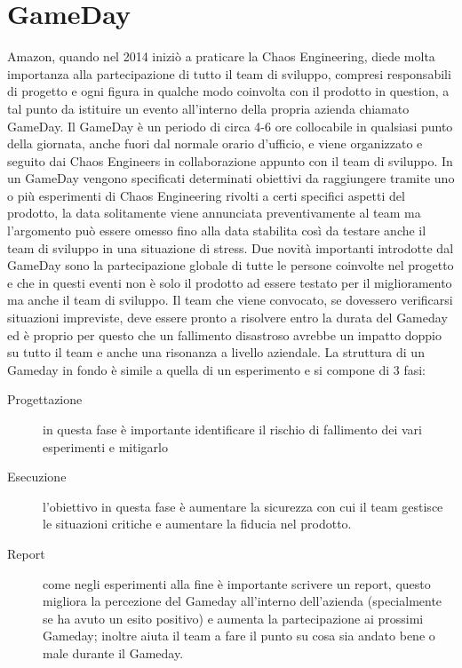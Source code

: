 \section{GameDay}
Amazon, quando nel 2014 iniziò a praticare la Chaos Engineering, diede molta importanza alla partecipazione di tutto il team di sviluppo, compresi responsabili di progetto e ogni figura in qualche modo coinvolta con il prodotto in question, a tal punto da istituire un evento all'interno della propria azienda chiamato GameDay.
Il GameDay è un periodo di circa 4-6 ore collocabile in qualsiasi punto della giornata, anche fuori dal normale orario d'ufficio, e viene organizzato e seguito dai Chaos Engineers in collaborazione appunto con il team di sviluppo.
In un GameDay vengono specificati determinati obiettivi da raggiungere tramite uno o più esperimenti di Chaos Engineering rivolti a certi specifici aspetti del prodotto, la data solitamente viene annunciata preventivamente al team ma l'argomento può essere omesso fino alla data stabilita così da testare anche il team di sviluppo in una situazione di stress.
Due novità importanti introdotte dal GameDay sono la partecipazione globale di tutte le persone coinvolte nel progetto e che in questi eventi non è solo il prodotto ad essere testato per il miglioramento ma anche il team di sviluppo.
Il team che viene convocato, se dovessero verificarsi situazioni impreviste, deve essere pronto a risolvere entro la durata del Gameday ed è proprio per questo che un fallimento disastroso avrebbe un impatto doppio su tutto il team e anche una risonanza a livello aziendale.
La struttura di un Gameday in fondo è simile a quella di un esperimento e si compone di 3 fasi:
\begin{description}
    \item[Progettazione] in questa fase è importante identificare il rischio di fallimento dei vari esperimenti e mitigarlo
    \item[Esecuzione] l'obiettivo in questa fase è aumentare la sicurezza con cui il team gestisce le situazioni critiche e aumentare la fiducia nel prodotto.
    \item[Report] come negli esperimenti alla fine è importante scrivere un report, questo migliora la percezione del Gameday all'interno dell'azienda (specialmente se ha avuto un esito positivo) e aumenta la partecipazione ai prossimi Gameday; inoltre aiuta il team a fare il punto su cosa sia andato bene o male durante il Gameday.
\end{description}

